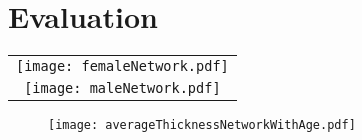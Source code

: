 \section{Evaluation}


\begin{figure*}
  \centering
  \begin{tabular}{c}
  \texttt{[image: femaleNetwork.pdf]} \\
  \texttt{[image: maleNetwork.pdf]}
  \end{tabular}
  \caption{
  }
  \label{fig:network}
\end{figure*}

\begin{figure}
  \centering
  \texttt{[image: averageThicknessNetworkWithAge.pdf]}
  \caption{
  }
  \label{fig:corr_vs_age}
\end{figure}



